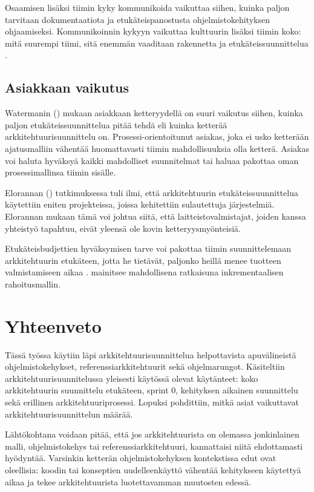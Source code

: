 Osaamisen lisäksi tiimin kyky kommunikoida vaikuttaa siihen, kuinka paljon tarvitaan dokumentaatiota ja etukäteispanostusta ohjelmistokehityksen ohjaamiseksi. Kommunikoinnin kykyyn vaikuttaa kulttuurin lisäksi tiimin koko: mitä suurempi tiimi, sitä enemmän vaaditaan rakennetta ja etukäteissuunnittelua \citep{waterman_how_2015}.

\section{Asiakkaan vaikutus}
Watermanin (\citeyear{waterman_how_2015}) mukaan asiakkaan ketteryydellä on suuri vaikutus siihen, kuinka paljon etukäteissuunnittelua pitää tehdä eli kuinka ketterää arkkitehtuurisuunnittelu on. Prosessi-orientoitunut asiakas, joka ei usko ketterään ajatusmalliin vähentää huomattavasti tiimin mahdollisuuksia olla ketterä. Asiakas voi haluta hyväksyä kaikki mahdolliset suunnitelmat tai haluaa pakottaa oman prosessimallinsa tiimin sisälle. 

Elorannan (\citeyear{eloranta2015techniques}) tutkimuksessa tuli ilmi, että arkkitehtuurin etukäteissuunnittelua käytettiin eniten projekteissa, joissa kehitettiin sulautettuja järjestelmiä. Elorannan mukaan tämä voi johtua siitä, että laitteistovalmistajat, joiden kanssa yhteistyö tapahtuu, eivät yleensä ole kovin ketteryysmyönteisiä.

Etukäteisbudjettien hyväksymisen tarve voi pakottaa tiimin suunnittelemaan arkkitehtuurin etukäteen, jotta he tietävät, paljonko heillä menee tuotteen valmistamiseen aikaa \citep{waterman_how_2015}. \cite{abrahamsson2010agility} mainitsee mahdollisena ratkaisuna inkrementaalisen rahoitusmallin. 

\chapter{Yhteenveto}
Tässä työssa käytiin läpi arkkitehtuurisuunnittelua helpottavista apuvälineistä ohjelmistokehykset, referenssiarkkitehtuurit sekä ohjelmarungot. Käsiteltiin arkkitehtuurisuunnitelussa yleisesti käytössä olevat käytänteet: koko arkkitehtuurin suunnittelu etukäteen, sprint 0, kehityksen aikainen suunnittelu sekä erillinen arkkitehtuuriprosessi. Lopuksi pohdittiin, mitkä asiat vaikuttavat arkkitehtuurisuunnittelun määrää.

Lähtökohtana voidaan pitää, että jos arkkitehtuurista on olemassa jonkinlainen malli, ohjelmistokehys tai referenssiarkkitehtuuri, kannattaisi niitä ehdottamasti hyödyntää. Varsinkin ketterän ohjelmistokehyksen kontekstissa edut ovat oleellisia: koodin tai konseptien uudelleenkäyttö vähentää kehitykseen käytettyä aikaa ja tekee arkkitehtuurista luotettavamman muutosten edessä.

